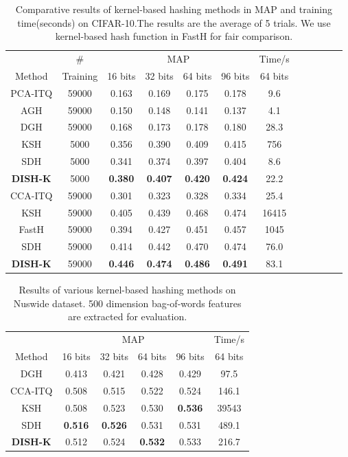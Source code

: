 \documentclass[conference]{IEEEtran}
\begin{document}
\begin{table}[t]
    \centering
    \footnotesize 
    \begin{tabular}{c|c|cccc|cccc|c|c}
        \hline
         & \#  & \multicolumn{4}{c|}{MAP}  & Time/s \\ 
        Method & Training & 16 bits & 32 bits & 64 bits & 96 bits & 64 bits\\ 
        \hline
        PCA-ITQ & 59000 & 0.163 & 0.169 & 0.175 & 0.178 & 9.6 \\ 
        AGH & 59000 & 0.150 & 0.148 & 0.141 & 0.137 & 4.1 \\ 
        DGH & 59000 & 0.168 & 0.173 & 0.178 & 0.180 & 28.3 \\
        \hline
        KSH & 5000 & 0.356 & 0.390 & 0.409 & 0.415 & 756 \\ 
        SDH & 5000 & 0.341 & 0.374 & 0.397 & 0.404 & 8.6 \\ 
        \textbf{DISH-K} & 5000 & \textbf{0.380} & \textbf{0.407} & \textbf{0.420} & \textbf{0.424} & 22.2 \\
        \hline
        CCA-ITQ & 59000 & 0.301 & 0.323 & 0.328 & 0.334 & 25.4 \\ 
        KSH & 59000 & 0.405 & 0.439 & 0.468 & 0.474 & 16415 \\ 
        FastH & 59000 & 0.394 & 0.427 & 0.451 & 0.457 & 1045 \\ 
        SDH & 59000 & 0.414 & 0.442 & 0.470 & 0.474 & 76.0 \\ 
        \textbf{DISH-K} & 59000 & \textbf{0.446} & \textbf{0.474} & \textbf{0.486} & \textbf{0.491} & 83.1\\ 
        \hline
    \end{tabular}
    \caption{Comparative results of kernel-based hashing methods in MAP and training time(seconds) on CIFAR-10.The results are the average of 5 trials. We use kernel-based hash function in FastH for fair comparison.}
    \label{tab:cifar10}
\end{table}

\begin{table}[t]
    \centering
    \footnotesize
    \begin{tabular}{c|cccc|c}
        \hline
         & \multicolumn{4}{c|}{MAP} & Time/s \\
        Method & 16 bits & 32 bits & 64 bits & 96 bits & 64 bits \\
        \hline
        DGH & 0.413 & 0.421 & 0.428 & 0.429 & 97.5 \\
        CCA-ITQ & 0.508 & 0.515 & 0.522 & 0.524 & 146.1 \\
        KSH & 0.508 & 0.523 & 0.530 & \textbf{0.536} & 39543 \\
        SDH & \textbf{0.516} & \textbf{0.526} & 0.531 & 0.531 & 489.1 \\
        \textbf{DISH-K} & 0.512 & 0.524 & \textbf{0.532} & 0.533 & 216.7 \\
        \hline
    \end{tabular}
    \caption{Results of various kernel-based hashing methods on Nuswide dataset. 500 dimension bag-of-words features are extracted for evaluation.}
    \label{tab:nuswide}
\end{table}
\end{document}
